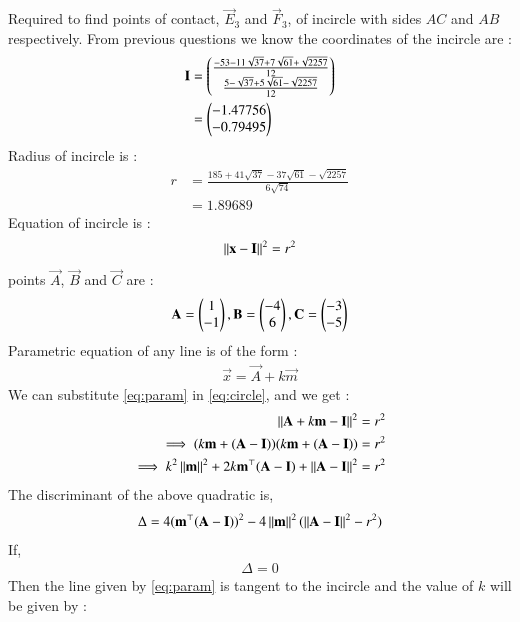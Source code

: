 \documentclass[journal,12pt,twocolumn]{IEEEtran}
\theoremstyle{remark}
\begin{document}
Required to find points of contact, $\vec{E}_3$ and $\vec{F}_3$, of incircle with sides $AC$ and $AB$ respectively.
From previous questions we know the coordinates of the incircle are : 
\begin{align}
	\mathbf{I} &= 
	\begin{pmatrix}
		\frac{-53-11\sqrt{37}+7\sqrt{61}+\sqrt{2257}}{12} \\ 
		\frac{5-\sqrt{37}+5\sqrt{61}-\sqrt{2257}}{12}
	\end{pmatrix} \\
	&= \begin{pmatrix}-1.47756 \\ -0.79495\end{pmatrix}
\end{align}
Radius of incircle is :
    \begin{align}
		r &= \frac{185+41\sqrt{37}-37\sqrt{61}-\sqrt{2257}}{6\sqrt{74}} \\
		&= 1.89689
	\end{align}
Equation of incircle is : 
\begin{align}
	{\left\lVert \mathbf{x}-\mathbf{I} \right\rVert}^2 = {r}^2 \label{eq:circle}
\end{align}
points $\vec{A}$, $\vec{B}$ and $\vec{C}$ are : 
\begin{align}
	\mathbf{A} = \begin{pmatrix}
		1\\
		-1
	\end{pmatrix}, 
	\mathbf{B} = \begin{pmatrix}
		-4\\
		6
	\end{pmatrix}, 
	\mathbf{C} = \begin{pmatrix}
		-3\\
		-5
	\end{pmatrix}
\end{align}
Parametric equation of any line is of the form :
\begin{align}
	\vec{x} = \vec{A} + k\vec{m} \label{eq:param}
\end{align}
We can substitute \eqref{eq:param} in \eqref{eq:circle}, and we get : 
\begin{align}
	{\left\lVert \mathbf{A}+k\mathbf{m}-\mathbf{I} \right\rVert}^2 &= {r}^2 \\
	\implies (k\mathbf{m} + (\mathbf{A} - \mathbf{I}))(k\mathbf{m} + (\mathbf{A} - \mathbf{I})) &= {r}^2 \\
	\implies k^2 \left\lVert\mathbf{m}\right\rVert^2 + 2k\mathbf{m}^{\top} (\mathbf{A}-\mathbf{I}) + \left\lVert\mathbf{A}-\mathbf{I}\right\rVert^2 &= {r}^2 
\end{align}
The discriminant of the above quadratic is,
\begin{align}
	\Delta = 4(\mathbf{m}^{\top}(\mathbf{A}-\mathbf{I}))^2 - 4\left\lVert\mathbf{m}\right\rVert^2(\left\lVert\mathbf{A}-\mathbf{I}\right\rVert^2 - r^2) \label{eq:Delta}
\end{align} 
If,
\begin{align}
	\Delta = 0
\end{align}
Then the line given by \eqref{eq:param} is tangent to the incircle and the value of $k$ will be given by :
\end{document}
